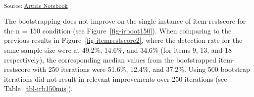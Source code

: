 \documentclass[
  letterpaper,
  DIV=11,
  numbers=noendperiod]{scrartcl}
\begin{document}
\textsubscript{Source:
\href{https://pgmj.github.io/rasch_itemfit/index.qmd.html}{Article
Notebook}}

The bootstrapping does not improve on the single instance of
item-restscore for the n = 150 condition (see
Figure~\ref{fig-irboot150}). When comparing to the previous results in
Figure~\ref{fig-itemrestscore2}, where the detection rate for the same
sample size were at 49.2\%, 14.6\%, and 34.6\% (for items 9, 13, and 18
respectively), the corresponding median values from the bootstrapped
item-restscore with 250 iterations were 51.6\%, 12.4\%, and 37.2\%.
Using 500 bootstrap iterations did not result in relevant improvements
over 250 iterations (see Table~\ref{tbl-irb150mis}).

\begin{table}

\caption{\label{tbl-irb150mis}Summary statistics for item-restscore
bootstrap simulation (n = 150)}

\begin{minipage}{\linewidth}



\end{minipage}%
\newline
\begin{minipage}{\linewidth}



\end{minipage}%

\end{table}%
\end{document}
